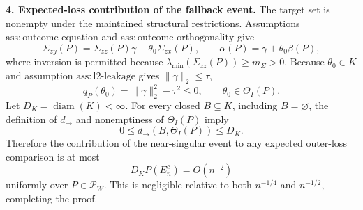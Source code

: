 \textbf{4. Expected-loss contribution of the fallback event.}
The target set is nonempty under the maintained structural restrictions. Assumptions \(\mathrm{ass:outcome\mbox{-}equation}\) and \(\mathrm{ass:outcome\mbox{-}orthogonality}\) give
\[
 \Sigma_{zy}(P)=\Sigma_{zz}(P)\gamma+\theta_0\Sigma_{zx}(P),
 \qquad
 \alpha(P)=\gamma+\theta_0\beta(P),
\]
where inversion is permitted because \(\lambda_{\min}(\Sigma_{zz}(P))\geq m_{\Sigma}>0\). Because \(\theta_0\in K\) and assumption \(\mathrm{ass:l2\mbox{-}leakage}\) gives \(\|\gamma\|_2\leq\tau\),
\[
 q_P(\theta_0)=\|\gamma\|_2^2-\tau^2\leq0,
 \qquad
 \theta_0\in\Theta_I(P).
\]
Let \(D_K=\operatorname{diam}(K)<\infty\). For every closed \(B\subseteq K\), including \(B=\varnothing\), the definition of \(d_{\to}\) and nonemptiness of \(\Theta_I(P)\) imply
\[
 0\leq d_{\to}(B,\Theta_I(P))\leq D_K.
\]
Therefore the contribution of the near-singular event to any expected outer-loss comparison is at most
\[
 D_KP(E_n^c)=O(n^{-2})
\]
uniformly over \(P\in\mathcal P_W\). This is negligible relative to both \(n^{-1/4}\) and \(n^{-1/2}\), completing the proof.
